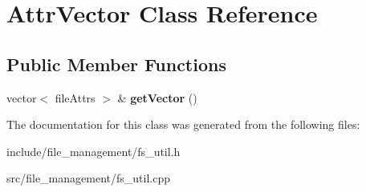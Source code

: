 \hypertarget{classAttrVector}{\section{\-Attr\-Vector \-Class \-Reference}
\label{d0/d39/classAttrVector}
}
\subsection*{\-Public \-Member \-Functions}
\begin{DoxyCompactItemize}
\item 
\hypertarget{classAttrVector_ad275d0597a50822974e652947c101fbf}{vector$<$ file\-Attrs $>$ \& {\bfseries get\-Vector} ()}\label{d0/d39/classAttrVector_ad275d0597a50822974e652947c101fbf}

\end{DoxyCompactItemize}


\-The documentation for this class was generated from the following files\-:\begin{DoxyCompactItemize}
\item 
include/file\-\_\-management/fs\-\_\-util.\-h\item 
src/file\-\_\-management/fs\-\_\-util.\-cpp\end{DoxyCompactItemize}

